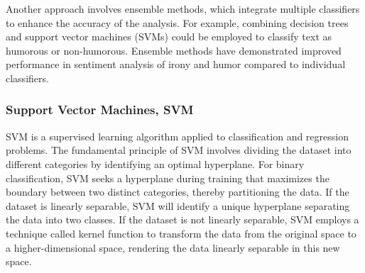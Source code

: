 \documentclass[a4paper]{article}
\begin{document}
Another approach involves ensemble methods, which integrate multiple classifiers to enhance the accuracy of the analysis. For example, combining decision trees and support vector machines (SVMs) could be employed to classify text as humorous or non-humorous. Ensemble methods have demonstrated improved performance in sentiment analysis of irony and humor compared to individual classifiers.

\subsubsection{Support Vector Machines, SVM}

SVM is a supervised learning algorithm applied to classification and regression problems. The fundamental principle of SVM involves dividing the dataset into different categories by identifying an optimal hyperplane. For binary classification, SVM seeks a hyperplane during training that maximizes the boundary between two distinct categories, thereby partitioning the data. If the dataset is linearly separable, SVM will identify a unique hyperplane separating the data into two classes. If the dataset is not linearly separable, SVM employs a technique called kernel function to transform the data from the original space to a higher-dimensional space, rendering the data linearly separable in this new space.
\end{document}
